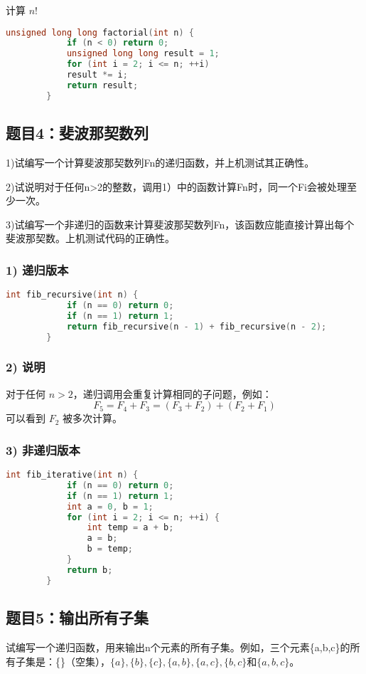 \documentclass[UTF8]{ctexart}
\begin{document}
	计算 $ n! $
	
	\begin{lstlisting}[language=C++]
		unsigned long long factorial(int n) {
			if (n < 0) return 0;
			unsigned long long result = 1;
			for (int i = 2; i <= n; ++i)
			result *= i;
			return result;
		}
	\end{lstlisting}
	
	\subsection{题目4：斐波那契数列}
	1)试编写一个计算斐波那契数列Fn的递归函数，并上机测试其正确性。
	
	2)试说明对于任何n>2的整数，调用1）中的函数计算Fn时，同一个Fi会被处理至少一次。
	
	3)试编写一个非递归的函数来计算斐波那契数列Fn，该函数应能直接计算出每个斐波那契数。上机测试代码的正确性。
	
	\subsubsection{1) 递归版本}
	\begin{lstlisting}[language=C++]
		int fib_recursive(int n) {
			if (n == 0) return 0;
			if (n == 1) return 1;
			return fib_recursive(n - 1) + fib_recursive(n - 2);
		}
	\end{lstlisting}
	
	\subsubsection{2) 说明}
	对于任何 $ n > 2 $，递归调用会重复计算相同的子问题，例如：
	$$
	F_5 = F_4 + F_3 = (F_3 + F_2) + (F_2 + F_1)
	$$
	可以看到 $ F_2 $ 被多次计算。
	
	\subsubsection{3) 非递归版本}
	\begin{lstlisting}[language=C++]
		int fib_iterative(int n) {
			if (n == 0) return 0;
			if (n == 1) return 1;
			int a = 0, b = 1;
			for (int i = 2; i <= n; ++i) {
				int temp = a + b;
				a = b;
				b = temp;
			}
			return b;
		}
	\end{lstlisting}
	
	\subsection{题目5：输出所有子集}
	试编写一个递归函数，用来输出n个元素的所有子集。例如，三个元素\{a,b,c\}的所有子集是：\{\}（空集），$\{a\},\{b\},\{c\},\{a,b\},\{a,c\},\{b,c\}\text{和}\{a,b,c\}$。
	
\end{document}
